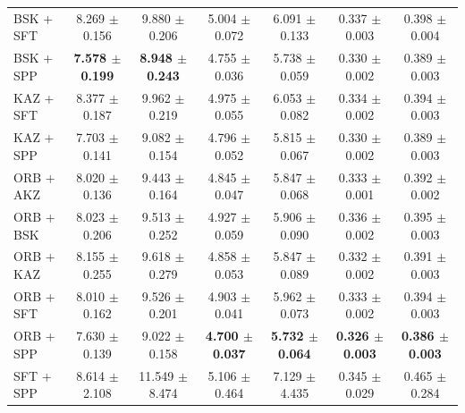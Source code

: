 \begin{table}[hbp]
\begin{tabular}{lcccccc}
BSK + SFT & 8.269 $\pm$ 0.156 & 9.880 $\pm$ 0.206 & 5.004 $\pm$ 0.072 & 6.091 $\pm$ 0.133 & 0.337 $\pm$ 0.003 & 0.398 $\pm$ 0.004 \\
BSK + SPP & \textbf{7.578 $\pm$ 0.199} & \textbf{8.948 $\pm$ 0.243} & 4.755 $\pm$ 0.036 & 5.738 $\pm$ 0.059 & 0.330 $\pm$ 0.002 & 0.389 $\pm$ 0.003 \\
KAZ + SFT & 8.377 $\pm$ 0.187 & 9.962 $\pm$ 0.219 & 4.975 $\pm$ 0.055 & 6.053 $\pm$ 0.082 & 0.334 $\pm$ 0.002 & 0.394 $\pm$ 0.003 \\
KAZ + SPP & 7.703 $\pm$ 0.141 & 9.082 $\pm$ 0.154 & 4.796 $\pm$ 0.052 & 5.815 $\pm$ 0.067 & 0.330 $\pm$ 0.002 & 0.389 $\pm$ 0.003 \\
ORB + AKZ & 8.020 $\pm$ 0.136 & 9.443 $\pm$ 0.164 & 4.845 $\pm$ 0.047 & 5.847 $\pm$ 0.068 & 0.333 $\pm$ 0.001 & 0.392 $\pm$ 0.002 \\
ORB + BSK & 8.023 $\pm$ 0.206 & 9.513 $\pm$ 0.252 & 4.927 $\pm$ 0.059 & 5.906 $\pm$ 0.090 & 0.336 $\pm$ 0.002 & 0.395 $\pm$ 0.003 \\
ORB + KAZ & 8.155 $\pm$ 0.255 & 9.618 $\pm$ 0.279 & 4.858 $\pm$ 0.053 & 5.847 $\pm$ 0.089 & 0.332 $\pm$ 0.002 & 0.391 $\pm$ 0.003 \\
ORB + SFT & 8.010 $\pm$ 0.162 & 9.526 $\pm$ 0.201 & 4.903 $\pm$ 0.041 & 5.962 $\pm$ 0.073 & 0.333 $\pm$ 0.002 & 0.394 $\pm$ 0.003 \\
ORB + SPP & 7.630 $\pm$ 0.139 & 9.022 $\pm$ 0.158 & \textbf{4.700 $\pm$ 0.037} & \textbf{5.732 $\pm$ 0.064} & \textbf{0.326 $\pm$ 0.003} & \textbf{0.386 $\pm$ 0.003} \\
SFT + SPP & 8.614 $\pm$ 2.108 & 11.549 $\pm$ 8.474 & 5.106 $\pm$ 0.464 & 7.129 $\pm$ 4.435 & 0.345 $\pm$ 0.029 & 0.465 $\pm$ 0.284 \\
\bottomrule
\end{tabular}
\end{table}